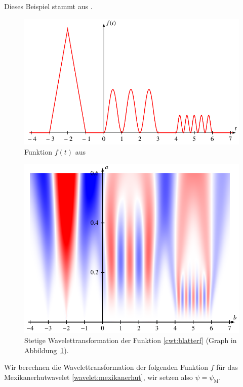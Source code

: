 \begin{beispiel}
Dieses Beispiel stammt aus \cite[p.~60]{buch:blatter}.
\begin{figure}
\centering
\includegraphics{chapters/4-cwt/images/f.pdf}
\caption{Funktion $f(t)$ aus \cite[p.~60]{buch:blatter}
\label{cwt:blatterfgraph}}
\end{figure}
\begin{figure}
\centering
\includegraphics{chapters/4-cwt/images/notes.pdf}
\caption{Stetige Wavelettransformation der Funktion \eqref{cwt:blatterf}
(Graph in Abbildung~\ref{cwt:blatterfgraph}).
\label{cwt:blattercwt}}
\end{figure}
Wir berechnen die Wavelettransformation der folgenden Funktion $f$
für das Mexikanerhutwavelet \eqref{wavelet:mexikanerhut}, wir setzen also
$\psi=\psi_\text{M}$.
\begin{equation}

\end{equation}
\end{beispiel}
